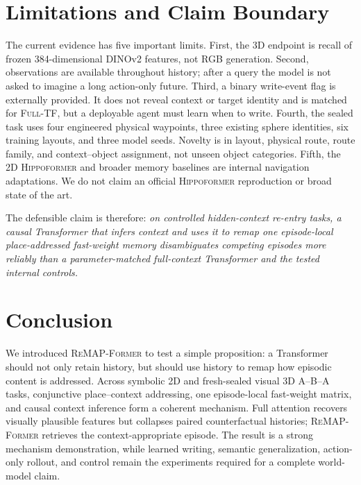 \documentclass{article}
\newcommand{\model}{\textsc{ReMAP-Former}}
\newcommand{\hippo}{\textsc{Hippoformer}}
\newcommand{\fulltf}{\textsc{Full-TF}}
\begin{document}
\section{Limitations and Claim Boundary}
\label{sec:limitations}

The current evidence has five important limits.
First, the 3D endpoint is recall of frozen 384-dimensional DINOv2 features, not RGB generation.
Second, observations are available throughout history; after a query the model is not asked to imagine a long action-only future.
Third, a binary write-event flag is externally provided.
It does not reveal context or target identity and is matched for \fulltf{}, but a deployable agent must learn when to write.
Fourth, the sealed task uses four engineered physical waypoints, three existing sphere identities, six training layouts, and three model seeds.
Novelty is in layout, physical route, route family, and context--object assignment, not unseen object categories.
Fifth, the 2D \hippo{} and broader memory baselines are internal navigation adaptations.
We do not claim an official \hippo{} reproduction or broad state of the art.

The defensible claim is therefore:
\emph{on controlled hidden-context re-entry tasks, a causal Transformer that infers context and uses it to remap one episode-local place-addressed fast-weight memory disambiguates competing episodes more reliably than a parameter-matched full-context Transformer and the tested internal controls.}

\section{Conclusion}

We introduced \model{} to test a simple proposition: a Transformer should not only retain history, but should use history to remap how episodic content is addressed.
Across symbolic 2D and fresh-sealed visual 3D A--B--A tasks, conjunctive place--context addressing, one episode-local fast-weight matrix, and causal context inference form a coherent mechanism.
Full attention recovers visually plausible features but collapses paired counterfactual histories; \model{} retrieves the context-appropriate episode.
The result is a strong mechanism demonstration, while learned writing, semantic generalization, action-only rollout, and control remain the experiments required for a complete world-model claim.



\end{document}
